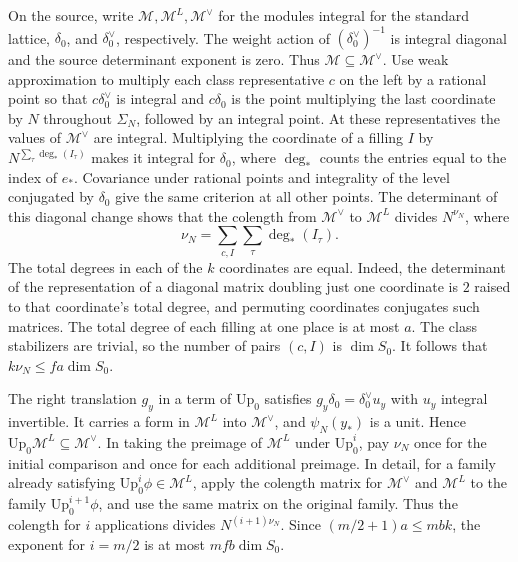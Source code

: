 On the source, write \(\mathscr M,\mathscr M^L,\mathscr M^\vee\) for
the modules integral for the standard lattice, \(\delta_0\), and
\(\delta_0^\vee\), respectively.
The weight action of \((\delta_0^\vee)^{-1}\) is integral diagonal and
the source determinant exponent is zero. Thus
\(\mathscr M\subseteq\mathscr M^\vee\).
Use weak approximation to multiply each class representative \(c\)
on the left by a rational point so that \(c\delta_0^\vee\) is integral
and \(c\delta_0\) is the point multiplying the last coordinate by \(N\)
throughout \(\Sigma_N\), followed by an integral point.
At these representatives the values of \(\mathscr M^\vee\) are integral.
Multiplying the coordinate of a filling \(I\) by
\(N^{\sum_\tau\deg_*(I_\tau)}\) makes it integral for \(\delta_0\),
where \(\deg_*\) counts the entries equal to the index of \(e_*\).
Covariance under rational points and integrality of the level
conjugated by \(\delta_0\) give the same criterion at all other points.
The determinant of this diagonal change shows that the colength from
\(\mathscr M^\vee\) to \(\mathscr M^L\) divides \(N^{\nu_N}\), where
\[
 \nu_N=\sum_{c,I}\sum_\tau\deg_*(I_\tau).
\]
The total degrees in each of the \(k\) coordinates are equal.
Indeed, the determinant of the representation of a diagonal matrix
doubling just one coordinate is \(2\) raised to that coordinate's
total degree, and permuting coordinates conjugates such matrices.
The total degree of each filling at one place is at most \(a\).
The class stabilizers are trivial, so the number of pairs \((c,I)\)
is \(\dim S_0\). It follows that \(k\nu_N\le fa\dim S_0\).

The right translation \(g_y\) in a term of \(\mathrm{Up}_0\) satisfies
\(g_y\delta_0=\delta_0^\vee u_y\) with \(u_y\) integral invertible.
It carries a form in \(\mathscr M^L\) into \(\mathscr M^\vee\), and
\(\psi_N(y_*)\) is a unit. Hence
\(\mathrm{Up}_0\mathscr M^L\subseteq\mathscr M^\vee\).
In taking the preimage of \(\mathscr M^L\) under \(\mathrm{Up}_0^i\),
pay \(\nu_N\) once for the initial comparison and once for each
additional preimage. In detail, for a family already satisfying
\(\mathrm{Up}_0^i\phi\in\mathscr M^L\), apply the colength matrix
for \(\mathscr M^\vee\) and \(\mathscr M^L\) to the family
\(\mathrm{Up}_0^{i+1}\phi\), and use the same matrix on the original family.
Thus the colength for \(i\) applications divides \(N^{(i+1)\nu_N}\).
Since \((m/2+1)a\le mbk\), the exponent for \(i=m/2\) is at most
\(mfb\dim S_0\).

